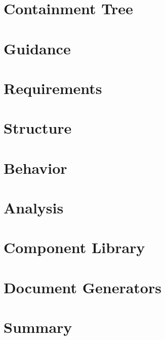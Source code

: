 \documentclass[12pt,letterpaper,oneside]{book}
\begin{document}
    	\section{Containment Tree}
        \label{ContainmentTree}
        

    	\section{Guidance}
        \label{Guidance}
        
        
    	\section{Requirements}
        \label{Requirements}
        
        
    	\section{Structure}
        \label{Structure}
        
        
    	\section{Behavior}
        \label{Behavior}
        
        
    	\section{Analysis}
        \label{Analysis}
        
        
        \section{Component Library}
        \label{ComponentLibrary}
        
        
        \section{Document Generators}
        \label{DocGenerators}
        
        
        \section{Summary}
        \label{Ch4Sum}
   		
        
\end{document}
